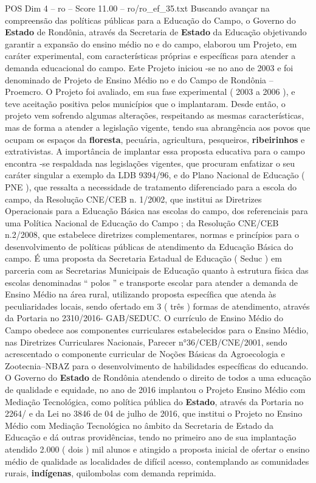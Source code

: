 \begin{textsample}{POS Dim 4 – ro – Score 11.00 – ro/ro\_ef\_35.txt}
Buscando avançar na compreensão das políticas públicas para a Educação do Campo, o Governo do \textbf{Estado} de Rondônia, através da Secretaria de \textbf{Estado} da Educação objetivando garantir a expansão do ensino médio no e do campo, elaborou um Projeto, em caráter experimental, com características próprias e específicas para atender a demanda educacional do campo.
Este Projeto iniciou -se no ano de 2003 e foi denominado de Projeto de Ensino Médio no e do Campo de Rondônia – Proemcro.
O Projeto foi avaliado, em sua fase experimental ( 2003 a 2006 ), e teve aceitação positiva pelos municípios que o implantaram.
Desde então, o projeto vem sofrendo algumas alterações, respeitando as mesmas características, mas de forma a atender a legislação vigente, tendo sua abrangência aos povos que ocupam os espaços da \textbf{floresta}, pecuária, agricultura, pesqueiros, \textbf{ribeirinhos} e extrativistas.
A importância de implantar essa proposta educativa para o campo encontra -se respaldada nas legislações vigentes, que procuram enfatizar o seu caráter singular a exemplo da LDB 9394/96, e do Plano Nacional de Educação ( PNE ), que ressalta a necessidade de tratamento diferenciado para a escola do campo, da Resolução CNE/CEB n. 1/2002, que institui as Diretrizes Operacionais para a Educação Básica nas escolas do campo, dos referenciais para uma Política Nacional de Educação do Campo ; da Resolução CNE/CEB n.2/2008, que estabelece diretrizes complementares, normas e princípios para o desenvolvimento de políticas públicas de atendimento da Educação Básica do campo.
É uma proposta da Secretaria Estadual de Educação ( Seduc ) em parceria com as Secretarias Municipais de Educação quanto à estrutura física das escolas denominadas “ polos ” e transporte escolar para atender a demanda de Ensino Médio na área rural, utilizando proposta específica que atenda às peculiaridades locais, sendo ofertado em 3 ( três ) formas de atendimento, através da Portaria no 2310/2016- GAB/SEDUC.
O currículo de Ensino Médio do Campo obedece aos componentes curriculares estabelecidos para o Ensino Médio, nas Diretrizes Curriculares Nacionais, Parecer n{\EmojiFont °}36/CEB/CNE/2001, sendo acrescentado o componente curricular de Noções Básicas da Agroecologia e Zootecnia–NBAZ para o desenvolvimento de habilidades específicas do educando.
O Governo do \textbf{Estado} de Rondônia atendendo o direito de todos a uma educação de qualidade e equidade, no ano de 2016 implantou o Projeto Ensino Médio com Mediação Tecnológica, como política pública do \textbf{Estado}, através da Portaria no 2264/ e da Lei no 3846 de 04 de julho de 2016, que institui o Projeto no Ensino Médio com Mediação Tecnológica no âmbito da Secretaria de Estado da Educação e dá outras providências, tendo no primeiro ano de sua implantação atendido 2.000 ( dois ) mil alunos e atingido a proposta inicial de ofertar o ensino médio de qualidade as localidades de difícil acesso, contemplando as comunidades rurais, \textbf{indígenas}, quilombolas com demanda reprimida.

\end{textsample}
